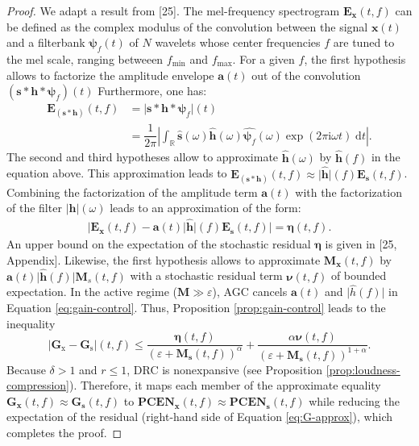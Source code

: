 \documentclass[journal]{IEEEtran}
\theoremstyle{remark}
\begin{document}
\begin{proof}
We adapt a result from [25].
The mel-frequency spectrogram $\mathbf{E}_{\mathbf{x}}(t,f)$ can be defined as the complex modulus of the convolution between the signal $\mathbf{x}(t)$ and a filterbank $\mathbf{\psi}_{f} (t)$ of $N$ wavelets whose center frequencies $f$ are tuned to the mel scale, ranging betweeen $f_{\min}$ and $f_{\max}$.
For a given $f$, the first hypothesis allows to factorize the amplitude envelope $\mathbf{a}(t)$ out of the convolution $(\mathbf{s}\ast\mathbf{h}\ast\boldsymbol{\psi}_f)(t)$
Furthermore, one has:
\begin{align}
\mathbf{E}_{(\mathbf{s}\ast\mathbf{h})} (t,f) & =
\vert \mathbf{s} \ast \mathbf{h} \ast \boldsymbol{\psi}_f \vert (t)
\nonumber \\
& = \dfrac{1}{2\pi} \left \vert \int_{\mathbb{R}} \widehat{\mathbf{s}}(\omega) \widehat{\mathbf{h}}(\omega) \widehat{\boldsymbol{\psi}_f}(\omega) \exp(2 \pi \mathrm{i} \omega t) \;\mathrm{d}t \right \vert.
\end{align}
The second and third hypotheses allow to approximate $\widehat{\mathbf{h}}(\omega)$ by $\widehat{\mathbf{h}}(f)$ in the equation above.
This approximation leads to $\mathbf{E}_{(\mathbf{s}\ast\mathbf{h})} (t,f) \approx \vert\widehat{\mathbf{h}}\vert (f) \mathbf{E}_{\mathbf{s}} (t,f)$.
Combining the factorization of the amplitude term $\mathbf{a}(t)$ with the factorization of the filter $\vert\mathbf{h}\vert(\omega)$ leads to an approximation of the form:
\begin{align}
\big\vert \mathbf{E}_\mathbf{x}(t,f) - \mathbf{a}(t) \vert\widehat{\mathbf{h}}\vert(f) \mathbf{E}_\mathbf{s}(t,f) \big\vert = \boldsymbol{\eta}(t,f).
\end{align}
An upper bound on the expectation of the stochastic residual $\boldsymbol{\eta}$ is given in [25, Appendix].
Likewise, the first hypothesis allows to approximate $\mathbf{M}_\mathbf{x}(t,f)$ by $\mathbf{a}(t) \vert \widehat{\mathbf{h}}(f) \vert \mathbf{M}_s(t,f)$ with a stochastic residual term $\mathbf{\nu}(t,f)$ of bounded expectation.
In the active regime ($\mathbf{M}\gg\varepsilon$), AGC cancels $\mathbf{a}(t)$ and $\vert\widehat{h}(f)\vert$ in Equation \ref{eq:gain-control}.
Thus, Proposition \ref{prop:gain-control} leads to the inequality
\begin{equation}
\vert \mathbf{G}_\mathrm{x} - \mathbf{G}_{\mathrm{s}} \vert (t,f)\leq
\dfrac{\boldsymbol{\eta}(t,f)}{(\varepsilon + \mathbf{M}_{\mathbf{s}}(t,f))^\alpha} + \dfrac{\alpha \boldsymbol{\nu}(t,f)}{(\varepsilon+\mathbf{M}_\mathbf{s} (t,f))^{1+\alpha}}.
\label{eq:G-approx}
\end{equation}
Because $\delta > 1$ and $r \leq 1$, DRC is nonexpansive (see Proposition \ref{prop:loudness-compression}).
Therefore, it maps each member of the approximate equality $\mathbf{G}_\mathbf{x} (t,f) \approx \mathbf{G}_\mathbf{s}(t,f)$ to $\mathbf{PCEN}_\mathbf{x} (t,f) \approx \mathbf{PCEN}_\mathbf{s}(t,f)$ while reducing the expectation of the residual (right-hand side of Equation \ref{eq:G-approx}), which completes the proof.
\end{proof}
\end{document}
